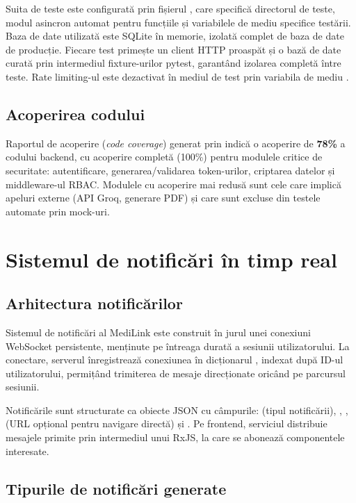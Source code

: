 Suita de teste este configurată prin fișierul , care specifică directorul de teste, modul asincron automat pentru funcțiile  și variabilele de mediu specifice testării. Baza de date utilizată este SQLite în memorie, izolată complet de baza de date de producție. Fiecare test primește un client HTTP proaspăt și o bază de date curată prin intermediul fixture-urilor pytest, garantând izolarea completă între teste. Rate limiting-ul este dezactivat în mediul de test prin variabila de mediu .

\subsection{Acoperirea codului}

Raportul de acoperire (\textit{code coverage}) generat prin  indică o acoperire de \textbf{78\%} a codului backend, cu acoperire completă (100\%) pentru modulele critice de securitate: autentificare, generarea/validarea token-urilor, criptarea datelor și middleware-ul RBAC. Modulele cu acoperire mai redusă sunt cele care implică apeluri externe (API Groq, generare PDF) și care sunt excluse din testele automate prin mock-uri.

\section{Sistemul de notificări în timp real}

\subsection{Arhitectura notificărilor}

Sistemul de notificări al MediLink este construit în jurul unei conexiuni WebSocket persistente, menținute pe întreaga durată a sesiunii utilizatorului. La conectare, serverul înregistrează conexiunea în dicționarul , indexat după ID-ul utilizatorului, permițând trimiterea de mesaje direcționate oricând pe parcursul sesiunii.

Notificările sunt structurate ca obiecte JSON cu câmpurile:  (tipul notificării), , ,  (URL opțional pentru navigare directă) și . Pe frontend, serviciul  distribuie mesajele primite prin intermediul unui  RxJS, la care se abonează componentele interesate.

\subsection{Tipurile de notificări generate}


